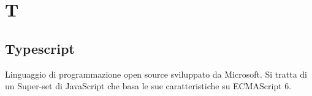 \section*{T}
\markright{}
\subsection*{Typescript}
Linguaggio di programmazione open source sviluppato da Microsoft. Si tratta di un Super-set di JavaScript che basa le sue caratteristiche su ECMAScript 6.